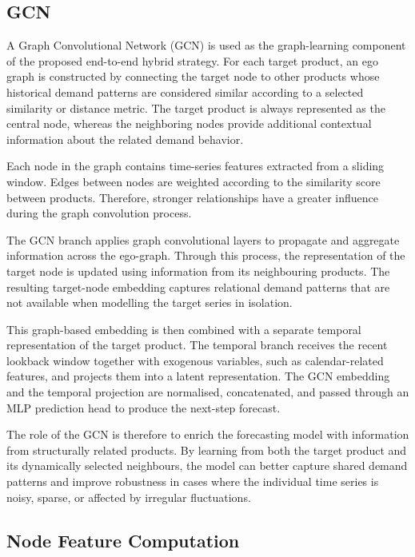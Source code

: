 \subsection{GCN}

A Graph Convolutional Network (GCN) is used as the graph-learning component of the proposed end-to-end hybrid strategy. For each target product, an ego graph is constructed by connecting the target node to other products whose historical demand patterns are considered similar according to a selected similarity or distance metric. The target product is always represented as the central node, whereas the neighboring nodes provide additional contextual information about the related demand behavior.

Each node in the graph contains time-series features extracted from a sliding window. Edges between nodes are weighted according to the similarity score between products. Therefore, stronger relationships have a greater influence during the graph convolution process.

The GCN branch applies graph convolutional layers to propagate and aggregate information across the ego-graph. Through this process, the representation of the target node is updated using information from its neighbouring products. The resulting target-node embedding captures relational demand patterns that are not available when modelling the target series in isolation.

This graph-based embedding is then combined with a separate temporal representation of the target product. The temporal branch receives the recent lookback window together with exogenous variables, such as calendar-related features, and projects them into a latent representation. The GCN embedding and the temporal projection are normalised, concatenated, and passed through an MLP prediction head to produce the next-step forecast.

The role of the GCN is therefore to enrich the forecasting model with information from structurally related products. By learning from both the target product and its dynamically selected neighbours, the model can better capture shared demand patterns and improve robustness in cases where the individual time series is noisy, sparse, or affected by irregular fluctuations.

\subsection{Node Feature Computation}

